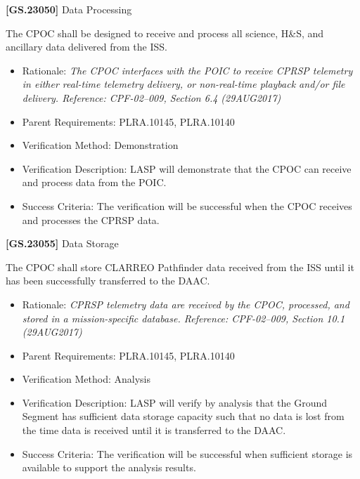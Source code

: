 \textbf{[GS.23050]} Data Processing

The \gls{CPOC} shall be designed to receive and process all science, H\&S, and ancillary data delivered from the \gls{ISS}.

\begin{itemize}
\item{} Rationale: \emph{The CPOC interfaces with the POIC to receive CPRSP telemetry in either real-time telemetry delivery, or non-real-time playback and\slash or file delivery. Reference: CPF-02--009, Section 6.4 (29AUG2017)}

\item{} Parent Requirements: PLRA.10145, PLRA.10140

\item{} Verification Method: Demonstration

\item{} Verification Description: \gls{LASP} will demonstrate that the \gls{CPOC} can receive and process data from the \gls{POIC}.

\item{} Success Criteria: The verification will be successful when the \gls{CPOC} receives and processes the \gls{CPRSP} data.

\end{itemize}

\textbf{[GS.23055]} Data Storage

The \gls{CPOC} shall store \gls{CLARREO} Pathfinder data received from the \gls{ISS} until it has been successfully transferred to the \gls{DAAC}.

\begin{itemize}
\item{} Rationale: \emph{CPRSP telemetry data are received by the CPOC, processed, and stored in a mission-specific database. Reference: CPF-02--009, Section 10.1 (29AUG2017)}

\item{} Parent Requirements: PLRA.10145, PLRA.10140

\item{} Verification Method: Analysis

\item{} Verification Description: \gls{LASP} will verify by \gls{analysis} that the Ground Segment has sufficient data storage capacity such that no data is lost from the time data is received until it is transferred to the \gls{DAAC}.

\item{} Success Criteria: The verification will be successful when sufficient storage is available to support the \gls{analysis} results.

\end{itemize}

